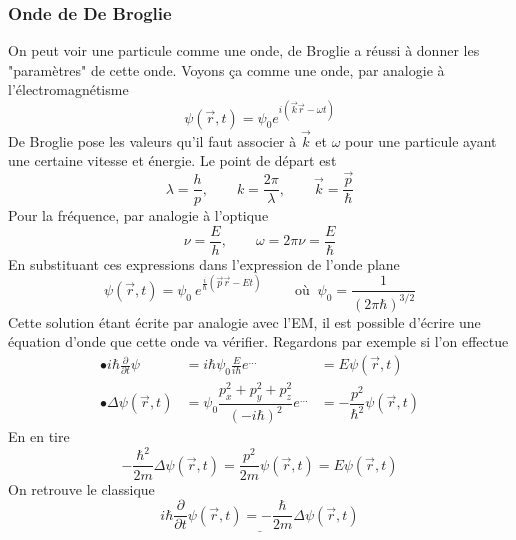 		\subsubsection{Onde de De Broglie}
		On peut voir une particule comme une onde, de Broglie a réussi à donner les "paramètres" de 
		cette onde. Voyons ça comme une onde, par analogie à l'électromagnétisme
		\begin{equation}
		\psi(\vec{r},t) = \psi_0e^{i(\vec{k}\vec{r}-\omega t)}
		\end{equation}
		De Broglie pose les valeurs qu'il faut associer à $\vec k$ et $\omega$ pour une particule ayant 
		une certaine vitesse et énergie. Le point de départ est
		\begin{equation}
		\lambda = \dfrac{h}{p},\qquad k=\dfrac{2\pi}{\lambda},\qquad \vec k=\dfrac{\vec{p}}{\hbar}
		\end{equation}
		Pour la fréquence, par analogie à l'optique
		\begin{equation}
		\nu = \dfrac{E}{h},\qquad \omega = 2\pi\nu = \dfrac{E}{\hbar}
		\end{equation}
		En substituant ces expressions dans l'expression de l'onde plane
		\begin{equation}
		\psi(\vec{r},t) = \psi_0\ e^{\frac{i}{\hbar}\left(\vec{p}\vec{r}-Et\right)}\qquad \text{ où }\ \psi_0 =
		\dfrac{1}{(2\pi\hbar)^{3/2}}
		\end{equation}
		Cette solution étant écrite par analogie avec l'EM, il est possible d'écrire une équation 
		d'onde que cette onde va vérifier. Regardons par exemple si l'on effectue
		\begin{equation}
		\begin{array}{lll}
		\bullet i\hbar\frac{\partial}{\partial t}\psi &= i\hbar \psi_0\frac{E}{i\hbar}e^{\dots} &=
		E\psi(\vec{r},t)\\
		\bullet \Delta \psi(\vec{r},t) &= \psi_0\dfrac{p_x^2+p_y^2+p_z^2}{(-i\hbar)^2}e^{\dots} &= -
		\dfrac{p^2}{\hbar^2}\psi(\vec{r},t)
		\end{array}
		\end{equation}
		En en tire
		\begin{equation}
		-\dfrac{\hbar^2}{2m}\Delta \psi(\vec{r},t) = \dfrac{p^2}{2m}\psi(\vec{r},t) = E\psi(\vec{r},t)
		\end{equation}
		On retrouve le classique
		\begin{equation}
		\underline{i\hbar\dfrac{\partial}{\partial t}\psi(\vec{r},t)= -\dfrac{\hbar}{2m}\Delta\psi(\vec{r},t)}
		\end{equation}
